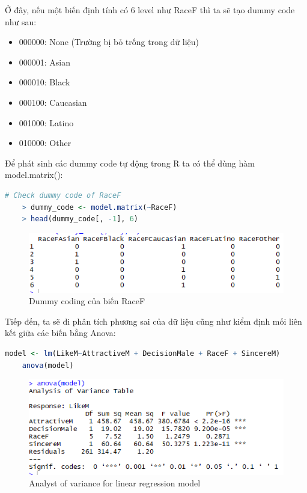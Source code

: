 \documentclass[a4paper,12pt]{article}
\begin{document}
	Ở đây, nếu một biến định tính có 6 level như RaceF thì ta sẽ tạo dummy code như sau:
	\begin{itemize}
		\item 000000: None (Trường bị bỏ trống trong dữ liệu)
		\item 000001: Asian
		\item 000010: Black
		\item 000100: Caucasian
		\item 001000: Latino
		\item 010000: Other
	\end{itemize}
	
	Để phát sinh các dummy code tự động trong R ta có thể dùng hàm model.matrix():
	\begin{lstlisting}[language=R]
	# Check dummy code of RaceF
	> dummy_code <- model.matrix(~RaceF)
	> head(dummy_code[, -1], 6)
	\end{lstlisting}
	
	\begin{figure}[H]
		\centering
		\includegraphics[width=0.7\linewidth]{dummy_coding}
		\caption{Dummy coding của biến RaceF}
		\label{fig:dummycoding}
	\end{figure}
	
	Tiếp đến, ta sẽ đi phân tích phương sai của dữ liệu cũng như kiểm định mối liên kết giữa các biến bằng Anova:
	\begin{lstlisting}[language=R]
	model <- lm(LikeM~AttractiveM + DecisionMale + RaceF + SincereM)
	anova(model)
	\end{lstlisting}
	
	\begin{figure}[H]
		\centering
		\includegraphics[width=0.7\linewidth]{anova1}
		\caption{Analyst of variance for linear regression model}
		\label{fig:anova1}
	\end{figure}
	
\end{document}
